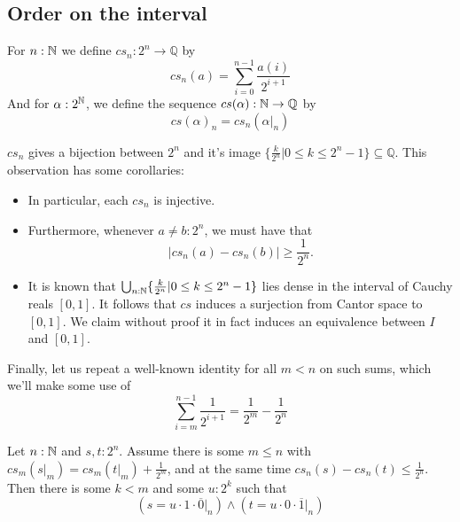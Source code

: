 \subsection{Order on the interval}
\begin{definition}
  For $n:\mathbb{N}$ we define 
  $cs_n:2^n \to \mathbb Q$ by 
  \begin{equation}
    cs_n(a) = \sum\limits_{i=0}^{n-1} \frac{a(i)} {2^{i+1}}
  \end{equation}
  And for $\alpha:2^{\mathbb{N}}$, we define the sequence $cs(\alpha) : \mathbb{N} \to \mathbb Q$ by 
  \begin{equation}
    cs(\alpha)_n = cs_n(\alpha|_n)
  \end{equation}
\end{definition}
\begin{remark}\label{rmkPropertiesCSn}
  $cs_n$ gives a bijection between $2^n$ and it's image 
  $\{\frac{k}{2^n}|0\leq k \leq 2^{n}-1\}\subseteq \mathbb Q$.
  This observation has some corollaries: 
  \begin{itemize}
    \item In particular, each $cs_n$ is injective. 
    \item Furthermore, whenever $a\neq b:2^n$, we must have that 
      \begin{equation} 
        |cs_n(a)-cs_n(b)|\geq \frac{1}{2^n}.
      \end{equation}
    \item It is known that $\bigcup_{n:\mathbb{N}} \{\frac{k}{2^n}|0\leq k \leq 2^{n}-1\}$ 
      lies dense in the interval of Cauchy reals $[0,1]$. 
      It follows that $cs$ induces a surjection from Cantor space to $[0,1]$. %
      We claim without proof it in fact induces an equivalence between $I$ and $[0,1]$.
  \end{itemize}
  Finally, let us repeat a well-known identity for all $m<n$ on such sums, which we'll make some use of 
  \begin{equation}
   \sum\limits_{i = m}^{n-1} \frac{1}{2^{i+1}} = \frac{1}{2^{m}} - \frac{1}{2^n}
  \end{equation}
\end{remark}
\begin{lemma}\label{CauchyApproxLemma}
  Let $n:\mathbb{N}$ and  $s,t:2^n$. Assume there is some $ m \leq n$ with $cs_m(s|_m) = cs_m(t|_m) + \frac{1}{2^m}$, and 
  at the same time $cs_n(s) -cs_n(t)\leq \frac{1}{2^n}$. 
  Then there is some $k< m$ and some $u:2^k$ such that 
  \begin{equation}
    (s = u \cdot 1 \cdot \overline 0|_n)
    \wedge 
    (t = u \cdot 0 \cdot \overline 1|_n)
  \end{equation}
\end{lemma}
